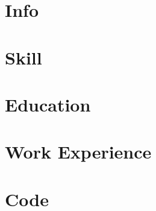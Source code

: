 \documentclass{article}
\begin{document}
	\section*{Info}
		
	\section*{Skill}
		
	\section*{Education}
		
	\section*{Work Experience}
		
	\section*{Code}
			
			
		
			
\end{document}
